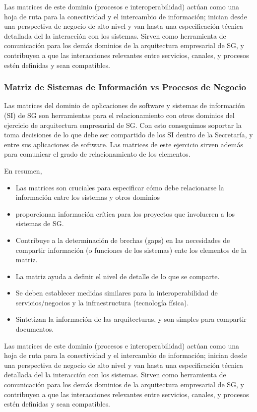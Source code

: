 \documentclass[
	a4paper, %
	12pt, %
]{include/CSSullivanBusinessReport}
\def\tightlist{}
\begin{document}
Las matrices de este dominio (procesos e interoperabilidad) actúan como
una hoja de ruta para la conectividad y el intercambio de información;
inician desde una perspectiva de negocio de alto nivel y van hasta una
especificación técnica detallada del la interacción con los sistemas.
Sirven como herramienta de comunicación para los demás dominios de la
arquitectura empresarial de SG, y contribuyen a que las interacciones
relevantes entre servicios, canales, y procesos estén definidas y sean
compatibles.

\subsubsection{Matriz de Sistemas de Información vs Procesos de
Negocio}\label{sec:matriz-de-sistemas-de-informaciuxf3n-vs-procesos-de-negocio}

Las matrices del dominio de aplicaciones de software y sistemas de
información (SI) de SG son herramientas para el relacionamiento con
otros dominios del ejercicio de arquitectura empresarial de SG. Con esto
conseguimos soportar la toma decisiones de lo que debe ser compartido de
los SI dentro de la Secretaría, y entre sus aplicaciones de software.
Las matrices de este ejercicio sirven además para comunicar el grado de
relacionamiento de los elementos.

En resumen,

\begin{itemize}
\tightlist
\item
  Las matrices son cruciales para especificar cómo debe relacionarse la
  información entre los sistemas y otros dominios
\item
  proporcionan información crítica para los proyectos que involucren a
  los sistemas de SG.
\item
  Contribuye a la determinación de brechas (gaps) en las necesidades de
  compartir información (o funciones de los sistemas) ente los elementos
  de la matriz.
\item
  La matriz ayuda a definir el nivel de detalle de lo que se comparte.
\item
  Se deben establecer medidas similares para la interoperabilidad de
  servicios/negocios y la infraestructura (tecnología física).
\item
  Sintetizan la información de las arquitecturas, y son simples para
  compartir documentos.
\end{itemize}

Las matrices de este dominio (procesos e interoperabilidad) actúan como
una hoja de ruta para la conectividad y el intercambio de información;
inician desde una perspectiva de negocio de alto nivel y van hasta una
especificación técnica detallada del la interacción con los sistemas.
Sirven como herramienta de comunicación para los demás dominios de la
arquitectura empresarial de SG, y contribuyen a que las interacciones
relevantes entre servicios, canales, y procesos estén definidas y sean
compatibles.
\end{document}
